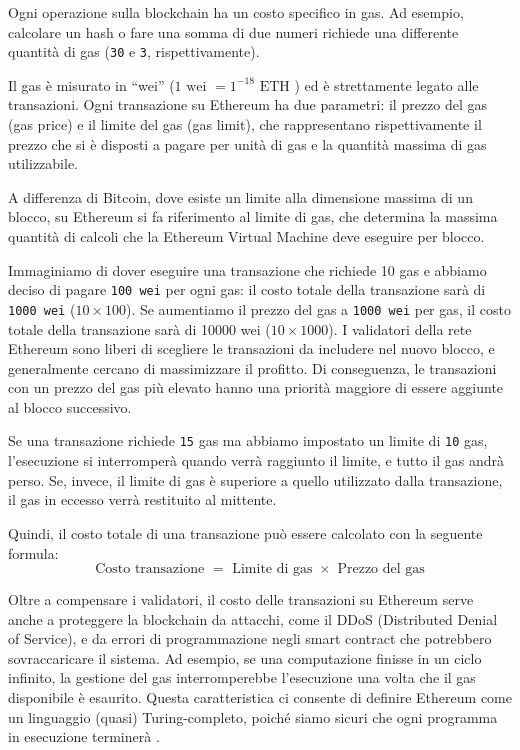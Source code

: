 Ogni operazione sulla blockchain ha un costo specifico in gas. Ad esempio, calcolare un hash o fare una somma di due numeri richiede una 
differente quantità di gas ({\tt 30} e {\tt 3}, rispettivamente). 

Il gas è misurato in “wei” ($1 \text{ wei } = 1^{-18} \text{ ETH }$) ed è strettamente legato alle transazioni. 
Ogni transazione su Ethereum ha due parametri: il prezzo del gas (gas price) e il limite del gas (gas limit), che rappresentano 
rispettivamente il prezzo che si è disposti a pagare per unità di gas e la quantità massima di gas utilizzabile.

A differenza di Bitcoin, dove esiste un limite alla dimensione massima di un blocco, su Ethereum si fa riferimento al limite di gas, che 
determina la massima quantità di calcoli che la Ethereum Virtual Machine deve eseguire per blocco.

Immaginiamo di dover eseguire una transazione che richiede 10 gas e abbiamo deciso di pagare {\tt 100 wei} per ogni gas: il costo totale della 
transazione sarà di {\tt 1000 wei} ($10 \times 100$). Se aumentiamo il prezzo del gas a {\tt 1000 wei} per gas, il costo totale della transazione sarà di 
10000 wei ($10 \times 1000$). I validatori della rete Ethereum sono liberi di scegliere le transazioni da includere nel nuovo blocco, e 
generalmente cercano di massimizzare il profitto. Di conseguenza, le transazioni con un prezzo del gas più elevato hanno una priorità 
maggiore di essere aggiunte al blocco successivo.

Se una transazione richiede {\tt 15} gas ma abbiamo impostato un limite di {\tt 10} gas, l’esecuzione si interromperà quando verrà raggiunto il limite, 
e tutto il gas andrà perso. Se, invece, il limite di gas è superiore a quello utilizzato dalla transazione, il gas in eccesso verrà restituito 
al mittente.

Quindi, il costo totale di una transazione può essere calcolato con la seguente formula: 
$$\text{Costo transazione } = \text{ Limite di gas } \times \text{ Prezzo del gas}$$

Oltre a compensare i validatori, il costo delle transazioni su Ethereum serve anche a proteggere la blockchain da attacchi, come il DDoS 
(Distributed Denial of Service), e da errori di programmazione negli smart contract che potrebbero sovraccaricare il sistema. Ad esempio, 
se una computazione finisse in un ciclo infinito, la gestione del gas interromperebbe l’esecuzione una volta che il gas disponibile è 
esaurito. Questa caratteristica ci consente di definire Ethereum come un linguaggio (quasi) Turing-completo, poiché siamo sicuri che 
ogni programma in esecuzione terminerà \cite{chiap2019blockchain}.

